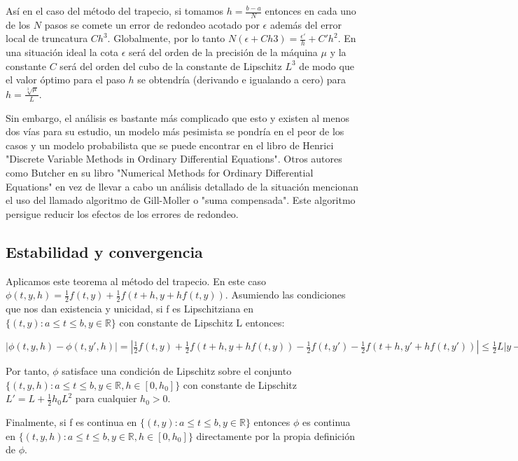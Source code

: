 \documentclass{article}
\theoremstyle{theorem-style}  %
\theoremstyle{definition-style}
\theoremstyle{example-style}
\begin{document}
Así en el caso del método del trapecio, si tomamos $h=\frac{b-a}{N}$ entonces en cada uno de los $N$ pasos se comete un error de redondeo acotado por $\epsilon$ además del error local de truncatura $Ch^{3}$. Globalmente, por lo tanto 
$N(\epsilon+Ch{3})=\frac{\epsilon'}{h}+C'h^{2}$. En una situación ideal la cota $\epsilon$ será del orden de la precisión de la máquina $\mu$ y la constante $C$ será del orden del cubo de la constante de Lipschitz $L^3$ de modo que el valor óptimo para el paso $h$ se obtendría (derivando e igualando a cero) para $h=\frac{\sqrt[3]\mu}{L}$.

Sin embargo, el análisis es bastante más complicado que esto y existen al menos dos vías para su estudio, un modelo más pesimista se pondría en el peor de los casos y un modelo probabilista que se puede encontrar en el libro de Henrici "Discrete Variable Methods in Ordinary Differential Equations". Otros autores como Butcher en su libro "Numerical Methods for Ordinary Differential Equations" en vez de llevar a cabo un análisis detallado de la situación mencionan el uso del llamado algoritmo de Gill-Moller o "suma compensada". Este algoritmo persigue reducir los efectos de los errores de redondeo.

\subsection{Estabilidad y convergencia} \label{sec:trapecio-explicito:estabilidad}

	Aplicamos este teorema al método del trapecio. En este caso $\phi(t,y,h)=\frac{1}{2}f(t,y)+\frac{1}{2}f(t+h,y+hf(t,y))$. Asumiendo las condiciones que nos dan existencia y unicidad, si f es Lipschitziana en 
	$\{(t,y):a \leq t \leq b, y \in \mathbb{R}\}$ 
	con constante de Lipschitz L entonces:
	
	$|\phi(t,y,h)-\phi(t,y',h)|=|\frac{1}{2}f(t,y)+\frac{1}{2}f(t+h,y+hf(t,y))-\frac{1}{2}f(t,y')-\frac{1}{2}f(t+h,y'+hf(t,y'))| \leq \frac{1}{2}L|y-y'|+\frac{1}{2}L|y+hf(t,y)-y'-hf(t,y')| \leq L |y-y'|+\frac{1}{2}L|hf(t,y)-hf(t,y')|=(L+\frac{1}{2}hL^{2})|y-y'|$ 
	
	Por tanto, $\phi$ satisface una condición de Lipschitz sobre el conjunto 
	$\{(t,y,h):a \leq t \leq b, y \in \mathbb{R}, h \in [0,h_0]\}$ 
	con constante de Lipschitz 
	$L'=L+\frac{1}{2} h_0 L^{2}$ 
	para cualquier $h_0 > 0$. 
	
	Finalmente, si f es continua en 
	$\{(t,y):a \leq t \leq b, y \in \mathbb{R}\}$ 
	entonces $\phi$ es continua en 
	$\{(t,y,h):a \leq t \leq b, y \in \mathbb{R}, h \in [0,h_0]\}$ 
	directamente por la propia definición de $\phi$. 
	
\end{document}
